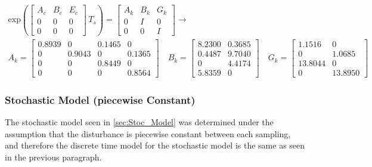\begin{equation}
    \begin{gathered}
            \text{exp}\left(\begin{bmatrix}
                A_c & B_c & E_c \\ 0 & 0 & 0 \\ 0 & 0 & 0 
            \end{bmatrix}\,T_s\right) = \begin{bmatrix}
                A_k & B_k & G_k \\ 0 & I & 0 \\ 0 & 0 & I
            \end{bmatrix}\xrightarrow{}\\
            A_k=\begin{bmatrix}
                0.8939 & 0 & 0.1465 & 0\\
                0 & 0.9043 & 0 & 0.1365\\
                0 & 0 & 0.8449 & 0\\
                0 & 0 & 0 & 0.8564
            \end{bmatrix} \quad
            B_k=\begin{bmatrix}
                8.2300 & 0.3685\\
                0.4487 & 9.7040\\
                0 & 4.4174\\
                5.8359 & 0
            \end{bmatrix} \quad
            G_k=\begin{bmatrix}
                1.1516 & 0 \\
                0 & 1.0685 \\
                13.8044 & 0\\
                0 & 13.8950
            \end{bmatrix}
    \end{gathered}
\end{equation}
\subsubsection{Stochastic Model (piecewise Constant)}
The stochastic model seen in \cref{sec:Stoc_Model} was determined under the assumption that the disturbance is piecewise constant between each sampling, and therefore the discrete time model for the stochastic model is the same as seen in the previous paragraph.
